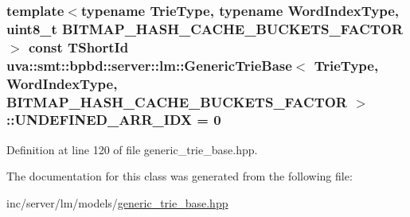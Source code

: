 \subsubsection[{U\+N\+D\+E\+F\+I\+N\+E\+D\+\_\+\+A\+R\+R\+\_\+\+I\+D\+X}]{\setlength{\rightskip}{0pt plus 5cm}template$<$typename Trie\+Type, typename Word\+Index\+Type, uint8\+\_\+t B\+I\+T\+M\+A\+P\+\_\+\+H\+A\+S\+H\+\_\+\+C\+A\+C\+H\+E\+\_\+\+B\+U\+C\+K\+E\+T\+S\+\_\+\+F\+A\+C\+T\+O\+R$>$ const {\bf T\+Short\+Id} {\bf uva\+::smt\+::bpbd\+::server\+::lm\+::\+Generic\+Trie\+Base}$<$ Trie\+Type, {\bf Word\+Index\+Type}, B\+I\+T\+M\+A\+P\+\_\+\+H\+A\+S\+H\+\_\+\+C\+A\+C\+H\+E\+\_\+\+B\+U\+C\+K\+E\+T\+S\+\_\+\+F\+A\+C\+T\+O\+R $>$\+::U\+N\+D\+E\+F\+I\+N\+E\+D\+\_\+\+A\+R\+R\+\_\+\+I\+D\+X = 0\hspace{0.3cm}{\ttfamily [static]}}\label{classuva_1_1smt_1_1bpbd_1_1server_1_1lm_1_1_generic_trie_base_a6fd6f53c986a715dbf7520d84c0f0f20}


Definition at line 120 of file generic\+\_\+trie\+\_\+base.\+hpp.



The documentation for this class was generated from the following file\+:\begin{DoxyCompactItemize}
\item 
inc/server/lm/models/\hyperlink{generic__trie__base_8hpp}{generic\+\_\+trie\+\_\+base.\+hpp}\end{DoxyCompactItemize}
